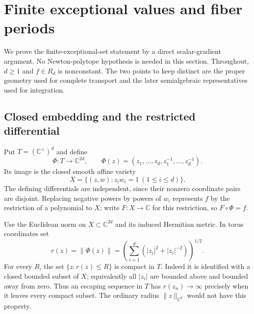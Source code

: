 \documentclass[11pt]{article}
\numberwithin{equation}{section}
\theoremstyle{definition}
\theoremstyle{remark}
\newcommand{\C}{\mathbb C}
\begin{document}
\section{Finite exceptional values and fiber periods}\label{sec:transport}
We prove the finite-exceptional-set statement by a direct scalar-gradient
argument. No Newton-polytope hypothesis is needed in this section.
Throughout, $d\ge1$ and $f\in R_d$ is nonconstant. The two points to
keep distinct are the proper geometry used for complete transport and
the later semialgebraic representatives used for integration.

\subsection{Closed embedding and the restricted differential}
Put $T=(\C^\times)^d$ and define
\begin{equation}\label{eq:closed-embedding}
 \Phi:T\longrightarrow\C^{2d},\qquad
 \Phi(z)=(z_1,\ldots,z_d,z_1^{-1},\ldots,z_d^{-1}).
\end{equation}
Its image is the closed smooth affine variety
\[
 X=\{(z,w):z_iw_i=1\ (1\le i\le d)\}.
\]
The defining differentials are independent, since their nonzero
coordinate pairs are disjoint. Replacing negative powers by powers of
$w_i$ represents $f$ by the restriction of a polynomial to $X$; write
$F:X\to\C$ for this restriction, so $F\circ\Phi=f$.

Use the Euclidean norm on $X\subset\C^{2d}$ and its induced Hermitian
metric. In torus coordinates set
\begin{equation}\label{eq:proper-radius}
 r(z)=\|\Phi(z)\|
     =\left(\sum_{i=1}^d(|z_i|^2+|z_i|^{-2})\right)^{1/2}.
\end{equation}
For every $R$, the set $\{z:r(z)\le R\}$ is compact in $T$.
Indeed it is identified with a closed bounded subset of $X$; equivalently
all $|z_i|$ are bounded above and bounded away from zero. Thus an
escaping sequence in $T$ has $r(z_n)\to\infty$ precisely when it leaves
every compact subset. The ordinary radius $\|z\|_{\C^d}$ would not have
this property.
\end{document}
